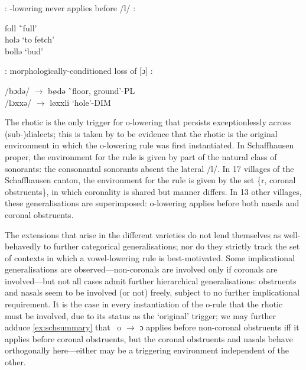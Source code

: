 \begin{example}\label{ex:schlateral} : -lowering never applies before /l/ \citep{Keel1982}:
\begin{tabbing}
        foll \tab[3cm] \= `full' \\
        holə  \> `to fetch' \\
        bollə \> `bud'
    \end{tabbing}
\end{example}

\begin{example}\label{ex:schmorph} : morphologically-conditioned loss of [ɔ] \citep{Garrett2014}:
\begin{tabbing}
        /bɔdə/ $\rightarrow$ bødə \tab[3cm] \=`floor, ground'-{\sc\scriptsize PL} \\
        /lɔxxə/ $\rightarrow$ løxxli \>`hole'-{\sc\scriptsize DIM}
    \end{tabbing}
\end{example}

The rhotic is the only trigger for o-lowering that persists exceptionlessly across (sub-)dialects; this is taken by \cite{Keel1982,JandaJoseph2003,Mielke2008} to be evidence that the rhotic is the original environment in which the o-lowering rule was first instantiated. In Schaffhausen proper, the environment for the rule is given by part of the natural class of sonorants: the consonantal sonorants absent the lateral /l/. In 17 villages of the Schaffhausen canton, the environment for the rule is given by the set \{r, coronal obstruents\}, in which coronality is shared but manner differs. In 13 other villages, these generalisations are superimposed: o-lowering applies before both nasals and coronal obstruents.

The extensions that arise in the different varieties do not lend themselves as well-behavedly to further categorical generalisations; nor do they strictly track the set of contexts in which a vowel-lowering rule is best-motivated. Some implicational generalisations are observed---non-coronals are involved only if coronals are involved---but not all cases admit further hierarchical generalisations: obstruents and nasals seem to be involved (or not) freely, subject to no further implicational requirement. It is the case in every instantiation of the o-rule that the rhotic must be involved, due to its status as the `original' trigger; we may further adduce \cref{ex:schsummary} that \ o $\rightarrow$ ɔ applies before non-coronal obstruents iff it applies before coronal obstruents, but the coronal obstruents and nasals behave orthogonally here---either may be a triggering environment independent of the other.

